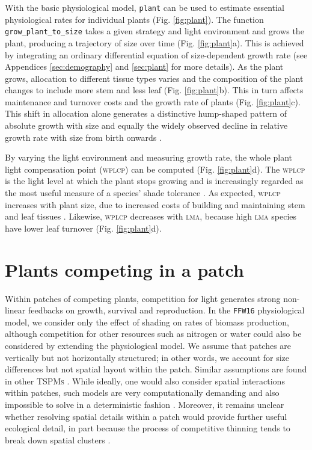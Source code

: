 \documentclass[a4paper,11pt]{article}
\newcommand{\plant}{\texttt{plant}}
\begin{document}
With the basic physiological model, {\plant} can be used to estimate
essential physiological rates for individual plants
(Fig. \ref{fig:plant}). The function \texttt{grow\_plant\_to\_size}
takes a given strategy and light environment and grows the plant,
producing a trajectory of size over time (Fig. \ref{fig:plant}a). This
is achieved by integrating an ordinary differential equation of
size-dependent growth rate (see Appendices \ref{sec:demography} and
\ref{sec:plant} for more details). As the plant grows, allocation to
different tissue types varies and the composition of the plant
changes to include more stem and less leaf
(Fig. \ref{fig:plant}b). This in turn affects maintenance and turnover
costs and the growth rate of plants (Fig. \ref{fig:plant}c).  This
shift in allocation alone generates a distinctive hump-shaped pattern
of absolute growth with size \citep{King-2011} and equally the widely
observed decline in relative growth rate with size from birth onwards
\citep{Enquist-2007}.

By varying the light environment and measuring growth rate, the whole
plant light compensation point (\textsc{wplcp}) can be computed (Fig.
\ref{fig:plant}d). The \textsc{wplcp} is the light level at which the plant
stops growing and is increasingly regarded as the most useful
measure of a species' shade tolerance
\citep{Givnish-1988, Baltzer-2007, Lusk-2013}. As expected, \textsc{wplcp}
increases with plant size, due to increased costs of building and
maintaining stem and leaf tissues \citep{Givnish-1988}. Likewise, \textsc{wplcp}
decreases with \textsc{lma}, because high \textsc{lma} species have lower leaf turnover
\citep{Baltzer-2007, Lusk-2013} (Fig.
\ref{fig:plant}d).

\section{Plants competing in a patch}

Within patches of competing plants, competition for light generates
strong non-linear feedbacks on growth, survival and reproduction. In the
\texttt{FFW16} physiological model, we consider only the effect of
shading on rates of biomass production, although competition for other
resources such as nitrogen or water could also be considered by extending the
physiological model. We assume that patches are vertically but not horizontally
structured; in other words, we account for size differences but not spatial
layout within the patch. Similar assumptions are found in other \textsc{TSPMs}
\citep{Shugart-1980, Kohyama-1993, Huston-1987, Moorcroft-2001, Smith-2014}.
While ideally, one would also consider spatial interactions within patches,
such models are very computationally demanding and also
impossible to solve in a deterministic fashion \citep{Shugart-1980,
Pacala-1996}. Moreover, it remains unclear whether resolving spatial details within a
patch would provide further useful ecological detail, in part because the
process of competitive thinning tends to break down spatial clusters
\citep{Strigul-2008}.
\end{document}
